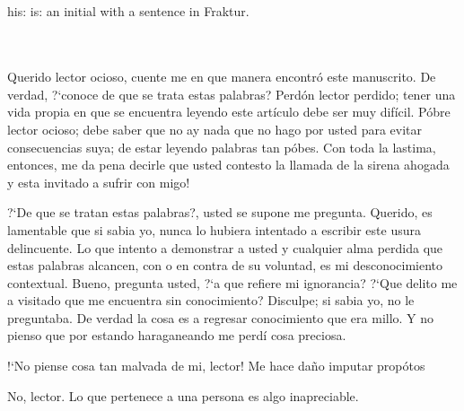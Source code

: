 \documentclass[12pt]{article}
\begin{document}
	\subsection{}
	\begin{multicols}{2}
		\setlength{\columnbreak}{1cm}
		{\frakfamily\fraklines
		his: is: an initial with a sentence in Fraktur.\\
		\\
		\\
		}
		\pagebreak
		
		Querido lector ocioso, cuente me en que manera encontr\'{o} este manuscrito.
		De verdad, \mbox{?`}conoce de que se trata estas palabras? Perd\'{o}n lector perdido; tener una vida propia en que se encuentra leyendo este art\'{i}culo debe ser muy difícil. P\'{o}bre lector ocioso; debe saber que no ay nada que no hago por usted para evitar consecuencias suya; de estar leyendo palabras tan p\'{o}bes. Con toda la lastima, entonces, me da pena decirle que usted contesto la llamada de la sirena ahogada y esta invitado a sufrir con migo!
		
		
		\mbox{?`}De que se tratan estas palabras?, usted se supone me pregunta. Querido, es lamentable que si sabia yo, nunca lo hubiera intentado a escribir este usura delincuente. Lo que intento a demonstrar a usted y cualquier alma perdida que estas palabras alcancen, con o en contra de su voluntad, es mi desconocimiento contextual. Bueno, pregunta usted, \mbox{?`}a que refiere mi ignorancia? \mbox{?`}Que delito me a visitado que me encuentra sin conocimiento? Disculpe; si sabia yo, no le preguntaba. De verdad la cosa es a regresar conocimiento que era millo. Y no pienso que por estando haraganeando me perd\'{i} cosa preciosa.
		
		\mbox{!`}No piense cosa tan malvada de mi, lector! Me hace da\~{n}o imputar prop\'{o}tos
		
		No, lector. Lo que pertenece a una persona es algo inapreciable.
	\end{multicols}
	
	
	
\end{document}
